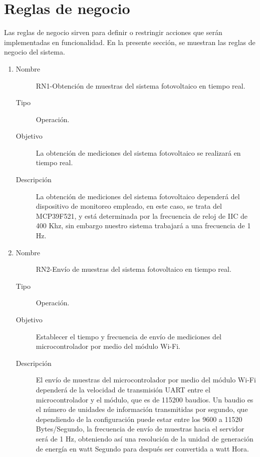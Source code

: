 \section{Reglas de negocio}
Las reglas de negocio sirven para definir o restringir acciones que serán implementadas en funcionalidad. 
En la presente sección, se muestran las reglas de negocio del sistema.
\begin{enumerate}[label=RN\arabic*.]
    \item \label{RN1}
		\begin{description}
			\item[Nombre] RN1-Obtención de muestras del sistema fotovoltaico en tiempo real.
			\item[Tipo] Operación.
			\item[Objetivo] La obtención de mediciones del sistema fotovoltaico se realizará en tiempo real.
			\item[Descripción] La obtención de mediciones del sistema fotovoltaico dependerá del dispositivo de monitoreo empleado, en este caso, se trata del MCP39F521, y está determinada por la frecuencia de reloj de IIC de 400 Khz, sin embargo nuestro sistema trabajará a una frecuencia de 1 Hz.
    		\end{description}
    		
\item \label{RN2}
	\begin{description}
		\item[Nombre] RN2-Envío de muestras del sistema fotovoltaico en tiempo real.
		\item[Tipo] Operación.
		\item[Objetivo] Establecer el tiempo y frecuencia de envío de mediciones del microcontrolador por medio del módulo Wi-Fi.
		\item[Descripción] El envío de muestras del microcontrolador por medio del módulo Wi-Fi dependerá de la velocidad de transmisión UART entre el microcontrolador y el módulo, que es de 115200 baudios. Un baudio es el número de unidades de información transmitidas por segundo, que dependiendo de la configuración puede estar entre los 9600 a 11520 Bytes/Segundo, la frecuencia de envío de muestras hacia el servidor será de 1 Hz, obteniendo así una resolución de la unidad de generación de energía en watt Segundo para después ser convertida a watt Hora.
		\end{description}	
		

\end{enumerate}
